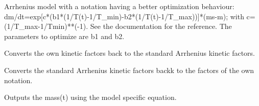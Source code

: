 \documentclass[letterpaper,10pt,english]{sphinxmanual}
\begin{document}
\begin{fulllineitems}
\label{FittingClasses:Fit_one_run.ArrheniusModelAlternativeNotation2}
Arrhenius model with a notation having a better optimization behaviour: dm/dt=exp{[}c*(b1*(1/T(t)-1/T\_min)-b2*(1/T(t)-1/T\_max)){]}*(ms-m); with c=(1/T\_max-1/Tmin)**(-1). See the documentation for the reference. The parameters to optimize are b1 and b2.

\begin{fulllineitems}
\label{FittingClasses:Fit_one_run.ArrheniusModelAlternativeNotation2.ConvertKinFactors}
Converts the own kinetic factors back to the standard Arrhenius kinetic factors.

\end{fulllineitems}


\begin{fulllineitems}
\label{FittingClasses:Fit_one_run.ArrheniusModelAlternativeNotation2.ConvertKinFactorsToOwnNotation}
Converts the standard Arrhenius kinetic factors backk to the factors of the own notation.

\end{fulllineitems}


\begin{fulllineitems}
\label{FittingClasses:Fit_one_run.ArrheniusModelAlternativeNotation2.calcMass}
Outputs the mass(t) using the model specific equation.

\end{fulllineitems}


\end{fulllineitems}

\end{document}
